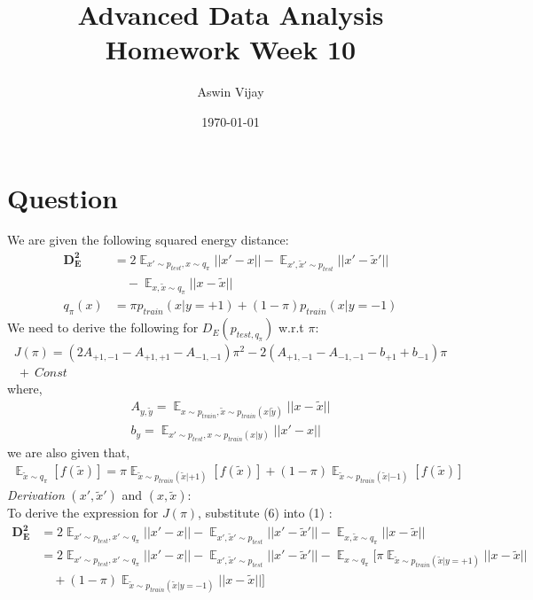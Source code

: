 \documentclass{article}
\title{Advanced Data Analysis\\Homework Week 10}
\author{Aswin Vijay}
\date\today
\DeclareMathOperator{\E}{\mathbb{E}}
\begin{document}
\maketitle %

\section{Question}
We are given the following squared energy distance:
\begin{align}
    \mathbf{D_E^2} &= 2 \E_{x'\sim p_{test}, x\sim q_{\pi}} ||x'-x|| - \E_{x', \tilde{x}' \sim p_{test}} ||x'- \tilde{x}'|| \\ 
    &\quad - \E_{x, \tilde{x} \sim q_{\pi}} ||x-\tilde{x}|| \nonumber \\ 
    q_{\pi}(x) &= \pi p_{train}(x|y = +1) + (1-\pi)p_{train}(x|y = -1)
\end{align}
We need to derive the following for $D_E(p_{test, q_{\pi}})$ w.r.t $\pi$:
\begin{align}
    J(\pi) = (2 A_{+1,-1} - A_{+1,+1}-A_{-1,-1})\pi^2 - 2(A_{+1,-1} - A_{-1,-1} - b_{+1} + b_{-1})\pi 
    \\ \ +\ Const \nonumber
\end{align}
where,
\begin{align}
    A_{y,\tilde{y}} = \E_{x \sim p_{train}, \tilde{x} \sim p_{train}(x|\tilde{y})} || x - \tilde{x} || \\
    b_y =  \E_{x' \sim p_{test}, x \sim p_{train}(x|y)} || x' - x ||
\end{align}
we are also given that,
\begin{align}
    \E_{\tilde{x} \sim q_{\pi}} [f(\tilde{x})] = \pi \E_{\tilde{x} \sim p_{train}(\tilde{x}|+1)}[f(\tilde{x})] + (1-\pi)\E_{\tilde{x} \sim p_{train}(\tilde{x}|-1)}[f(\tilde{x})]
\end{align}
\textit{Derivation} $(x',\tilde{x}')$ and $(x,\tilde{x})$:\vspace*{10pt}\\
To derive the expression for $J(\pi)$, substitute (6) into (1) :
\begin{align*}
\mathbf{D_E^2} &= 2 \E_{x'\sim p_{test}, x'\sim q_{\pi}} ||x'-x|| - \E_{x', \tilde{x}' \sim p_{test}} ||x'- \tilde{x}'|| - \E_{x, \tilde{x} \sim q_{\pi}} ||x-\tilde{x}|| \\
&= 2 \E_{x'\sim p_{test}, x'\sim q_{\pi}} ||x'-x|| - \E_{x', \tilde{x}' \sim p_{test}} ||x'- \tilde{x}'|| - \E_{x \sim q_{\pi}}[\pi \E_{\tilde{x} \sim p_{train}(\tilde{x}|y=+1)} ||x-\tilde{x}|| \\
&\quad + (1-\pi) \E_{\tilde{x} \sim p_{train}(\tilde{x}|y=-1)} ||x-\tilde{x}||]
\end{align*}
\end{document}
